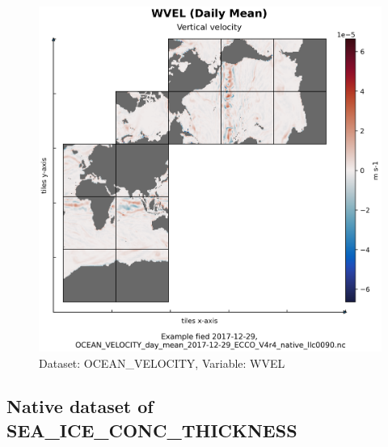 \begin{figure}[H]
\centering
\includegraphics[scale=0.55]{../images/plots/native_plots/Ocean_Velocity/WVEL.png}
\caption{Dataset: OCEAN\_VELOCITY, Variable: WVEL}
\label{tab:table-OCEAN_VELOCITY_WVEL-Plot}
\end{figure}
\subsection{Native dataset of SEA\_ICE\_CONC\_THICKNESS}
\newp
